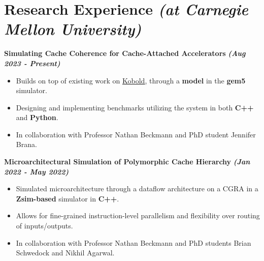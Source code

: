 \documentclass[10pt]{article}
\begin{document}
  \vspace*{-1.2cm}
    \section*{{\Large \textcolor{lighterB}{Research Experience}} {\normalsize \textit{\textcolor{lighterB}{(at Carnegie Mellon University)}}}}
  \vspace*{-0.23cm}

  \textbf{\large Simulating Cache Coherence for Cache-Attached Accelerators} {\hfill \textit{\textbf{(Aug 2023 - Present)}}}
  \vspace*{-0.17cm}
  \begin{itemize}
    \itemsep0em
    \item \textcolor{lighterG}{Builds on top of existing work on \href{https://ieeexplore.ieee.org/document/10106564}{\underline{Kobold}}, through a \textbf{model} in the \textbf{gem5} simulator.}
    \item \textcolor{lighterG}{Designing and implementing benchmarks utilizing the system in both \textbf{C++} and \textbf{Python}.}
    \item \textcolor{lighterG}{In collaboration with Professor Nathan Beckmann and PhD student Jennifer Brana.}
  \end{itemize}

  \textbf{\large Microarchitectural Simulation of Polymorphic Cache Hierarchy} {\hfill \textit{\textbf{(Jan 2022 - May 2022)}}}
  \vspace*{-0.17cm}
  \begin{itemize}
    \itemsep0em
    \item \textcolor{lighterG}{Simulated microarchitecture through a dataflow architecture on a CGRA in a \textbf{Zsim-based} simulator in \textbf{C++}.}
    \item \textcolor{lighterG}{Allows for fine-grained instruction-level parallelism and flexibility over routing of inputs/outputs.}
    \item \textcolor{lighterG}{In collaboration with Professor Nathan Beckmann and PhD students Brian Schwedock and Nikhil Agarwal.}
  \end{itemize}
\end{document}
